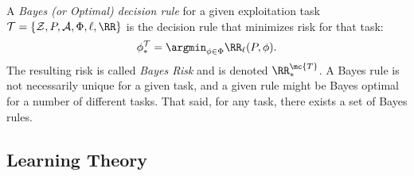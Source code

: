 \documentclass{article}
\begin{document}
\noindent  A \emph{Bayes (or Optimal) decision rule} for a given exploitation task $\mathcal{T}=\{\mathcal{Z}, P, \mathcal{A}, \Phi, \ell, \RR\}$ is the decision rule that minimizes risk for that task: 
\begin{align}
    \phi_*^\mathcal{T} = \argmin_{\phi \in \Phi} \RR_\ell(P,\phi).
\end{align}
The resulting risk is called \emph{Bayes Risk} and is denoted $\RR_*^{\mc{T}}$.  A Bayes rule is not necessarily unique for a given task, and a given rule might be Bayes optimal for a number of different tasks.  That said, for any task, there exists a set of Bayes rules.  


\subsection{Learning Theory}

\end{document}
